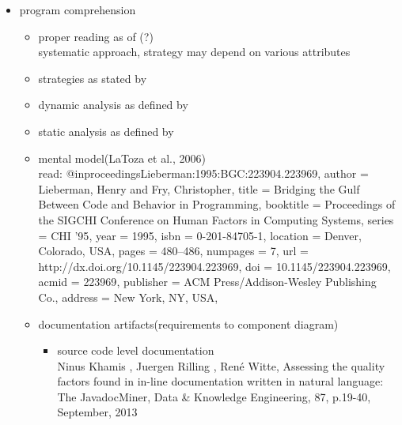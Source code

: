 \begin{itemize}
\item program comprehension
	\begin{itemize}
	\item proper reading as of \cite{Basili:1997:EPR:257260.257262}(?) \\ systematic approach, strategy may depend on various attributes
	\item strategies as stated by \cite{Storey:1999:CDE:308936.308940}
	\item dynamic analysis as defined by \cite{Ball:1999:CDA:318774.318944} \cite{Cornelissen:2009:SSP:1638616.1639301}
	\item static analysis as defined by \cite{Ball:1999:CDA:318774.318944}
	\item mental model(LaToza et al., 2006)\\ read: 
	@inproceedings{Lieberman:1995:BGC:223904.223969,
	 author = {Lieberman, Henry and Fry, Christopher},
	 title = {Bridging the Gulf Between Code and Behavior in Programming},
	 booktitle = {Proceedings of the SIGCHI Conference on Human Factors in Computing Systems},
	 series = {CHI '95},
	 year = {1995},
	 isbn = {0-201-84705-1},
	 location = {Denver, Colorado, USA},
	 pages = {480--486},
	 numpages = {7},
	 url = {http://dx.doi.org/10.1145/223904.223969},
	 doi = {10.1145/223904.223969},
	 acmid = {223969},
	 publisher = {ACM Press/Addison-Wesley Publishing Co.},
	 address = {New York, NY, USA},
	}
	\item documentation artifacts(requirements to component diagram)
		\begin{itemize}
		\item source code level documentation \\ Ninus Khamis , Juergen Rilling , René Witte, Assessing the quality factors found in in-line documentation written in natural language: The JavadocMiner, Data \& Knowledge Engineering, 87, p.19-40, September, 2013
		\end{itemize}
	\end{itemize}
	

\end{itemize}
